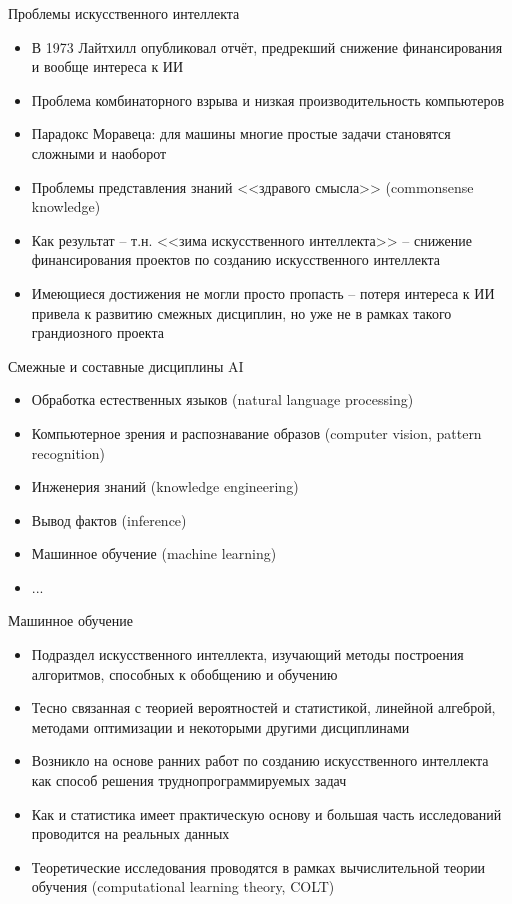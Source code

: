 \documentclass[compress,red,unicode]{beamer}
\begin{document}
\begin{frame}{Проблемы искусственного интеллекта}
\begin{itemize}
	\item В 1973 Лайтхилл опубликовал отчёт, предрекший снижение финансирования и вообще интереса к ИИ
	\item Проблема комбинаторного взрыва и низкая производительность компьютеров
	\item Парадокс Моравеца: для машины многие простые задачи становятся сложными и наоборот
	\item Проблемы представления знаний <<здравого смысла>> (commonsense knowledge)
	\item Как результат -- т.н. <<зима искусственного интеллекта>> -- снижение финансирования проектов по созданию искусственного интеллекта
	\item Имеющиеся достижения не могли просто пропасть -- потеря интереса к ИИ привела к развитию смежных дисциплин, но уже не в рамках такого грандиозного проекта
\end{itemize}
\end{frame}

\begin{frame}{Смежные и составные дисциплины AI}
\begin{itemize}
	\item Обработка естественных языков (natural language processing) 
	\item Компьютерное зрения и распознавание образов (computer vision, pattern recognition)
	\item Инженерия знаний (knowledge engineering)
	\item Вывод фактов (inference)
	\item Машинное обучение (machine learning)
	\item ...
\end{itemize}
\end{frame}


\begin{frame}{Машинное обучение}
\begin{itemize}
	\item Подраздел искусственного интеллекта, изучающий методы построения алгоритмов, способных к обобщению и обучению
	\item Тесно связанная с теорией вероятностей и статистикой, линейной алгеброй, методами оптимизации и некоторыми другими дисциплинами
	\item Возникло на основе ранних работ по созданию искусственного интеллекта как способ решения труднопрограммируемых задач
	\item Как и статистика имеет практическую основу и большая часть исследований проводится на реальных данных
	\item Теоретические исследования проводятся в рамках вычислительной теории обучения (computational learning theory, COLT)
\end{itemize}
\end{frame}
\end{document}

